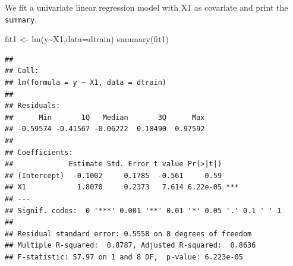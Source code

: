 \documentclass[
]{book}
\newenvironment{Shaded}{\begin{snugshade}}{\end{snugshade}}
\newcommand{\AttributeTok}[1]{\textcolor[rgb]{0.77,0.63,0.00}{#1}}
\newcommand{\CommentTok}[1]{\textcolor[rgb]{0.56,0.35,0.01}{\textit{#1}}}
\newcommand{\DecValTok}[1]{\textcolor[rgb]{0.00,0.00,0.81}{#1}}
\newcommand{\FloatTok}[1]{\textcolor[rgb]{0.00,0.00,0.81}{#1}}
\newcommand{\FunctionTok}[1]{\textcolor[rgb]{0.00,0.00,0.00}{#1}}
\newcommand{\NormalTok}[1]{#1}
\newcommand{\OtherTok}[1]{\textcolor[rgb]{0.56,0.35,0.01}{#1}}
\newcommand{\SpecialCharTok}[1]{\textcolor[rgb]{0.00,0.00,0.00}{#1}}
\begin{document}
\begin{Shaded}
\end{Shaded}

We fit a univariate linear regression model with X1 as covariate and print the \texttt{summary}.

\begin{Shaded}
\begin{Highlighting}[]
\NormalTok{fit1 }\OtherTok{\textless{}{-}} \FunctionTok{lm}\NormalTok{(y}\SpecialCharTok{\textasciitilde{}}\NormalTok{X1,}\AttributeTok{data=}\NormalTok{dtrain)}
\FunctionTok{summary}\NormalTok{(fit1)}
\end{Highlighting}
\end{Shaded}

\begin{verbatim}
## 
## Call:
## lm(formula = y ~ X1, data = dtrain)
## 
## Residuals:
##      Min       1Q   Median       3Q      Max 
## -0.59574 -0.41567 -0.06222  0.18490  0.97592 
## 
## Coefficients:
##             Estimate Std. Error t value Pr(>|t|)    
## (Intercept)  -0.1002     0.1785  -0.561     0.59    
## X1            1.8070     0.2373   7.614 6.22e-05 ***
## ---
## Signif. codes:  0 '***' 0.001 '**' 0.01 '*' 0.05 '.' 0.1 ' ' 1
## 
## Residual standard error: 0.5558 on 8 degrees of freedom
## Multiple R-squared:  0.8787, Adjusted R-squared:  0.8636 
## F-statistic: 57.97 on 1 and 8 DF,  p-value: 6.223e-05
\end{verbatim}
\end{document}
